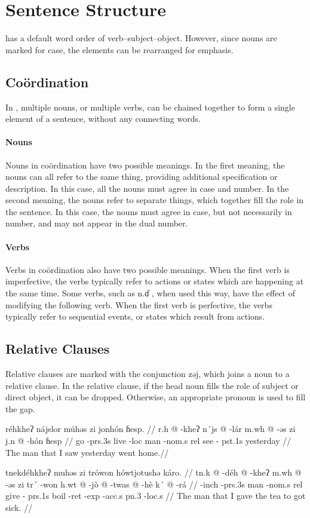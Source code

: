 \section{Sentence Structure}
\Langname{} has a default word order of verb--subject--object. However, since
nouns are marked for case, the elements can be rearranged for emphasis.

\subsection{Coördination}
In \Langname, multiple nouns, or multiple verbs, can be chained together to
form a single element of a sentence, without any connecting words.

\paragraph{Nouns} Nouns in coördination have two possible meanings. In the
first meaning, the nouns can all refer to the same thing, providing additional
specification or description. In this case, all the nouns must agree in case
and number. In the second meaning, the nouns refer to separate things, which
together fill the role in the sentence. In this case, the nouns must agree in
case, but not necessarily in number, and may not appear in the dual number.

\paragraph{Verbs} Verbs in coördination also have two possible meanings. When
the first verb is imperfective, the verbs typically refer to actions or states
which are happening at the same time. Some verbs, such as {\ll n.ɗ} , when used this way, have the effect of modifying the following verb.
When the first verb is perfective, the verbs typically refer to sequential
events, or states which result from actions.

\subsection{Relative Clauses}
Relative clauses are marked with the conjunction {\ll zəj}, which joins a noun
to a relative clause. In the relative clause, if the head noun fills the role
of subject or direct object, it can be dropped. Otherwise, an appropriate
pronoun is used to fill the gap.

\pex
\a
\begingl
\glpreamble réhkheʔ nájslor múhəs zi jonhón ɦesp. //
\gla r.h @ -kheʔ n´js @ -lár m.wh @ -əs zi j.n @ -hón ɦesp //
\glb go -{\sc prs}.3s live -{\sc loc} man -{\sc nom}.s {\sc rel} see -{\sc
pst}.1s yesterday //
\glft The man that I saw yesterday went home.//
\endgl

\a
\begingl
\glpreamble tnekdéhkheʔ muhəs zi trówon hówtjotushə káro. //
\gla tn.k @ -déh @ -kheʔ m.wh @ -əs zi tr´ -won h.wt @ -jò @ -twas @
-hè k´ @ -rá //
\glb {[be ill]} -{\sc inch} -{\sc prs}.3s man -{\sc nom}.s {\sc rel} give -{\sc
prs}.1s boil -{\sc ret} -{\sc exp} -{\sc acc}.s {\sc pn}.3 -{\sc loc}.s //
\glft The man that I gave the tea to got sick. //
\endgl
\xe

